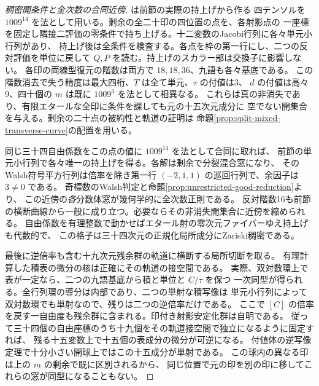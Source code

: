 \begin{proof}[稠密開条件と全次数の合同近傍]
 は前節の実際の持上げから作る
四テンソルを $1009^{14}$ を法として用いる。剰余の全二十印の四位置の点を、各射影点の
一座標を固定し隣接二評価の零条件で持ち上げる。十二変数のJacobi行列に各々単元小行列があり、
持上げ後は全条件を検査する。各点を枠の第一行にし、二つの反対評価を単位に戻して
$Q,P$ を読む。持上げのスカラー部は交換子に影響しない。
各印の両線型復元の階数は両方で $18,18,36$、九語も各々基底である。
この階数消去で失う精度は最大四桁、$T$ は全て単元、$\tau$ の付値は3、
$d$ の付値は高々9、四十個の $m$ は既に $1009^3$ を法として相異なる。
これらは真の非消失であり、有限エタールな全印に条件を課しても元の十五次元成分に
空でない開集合を与える。剰余の二十点の被約性と軌道の証明は
命題\ref{prop:split-mixed-transverse-curve}の配置を用いる。

同じ三十四自由係数をこの点の値に $1009^{14}$ を法として合同に取れば、
前節の単元小行列で各々唯一の持上げを得る。各解は剰余で分裂混合窓になり、
そのWalsh符号平方行列は倍率を除き第一行 $(-2,1,1)$ の巡回行列で、余因子は $3\ne0$ である。
奇標数のWalsh判定と命題\ref{prop:unrestricted-good-reduction}より、
この近傍の\emph{各}分数体窓が幾何学的に全次数正則である。
反対階数16も前節の横断曲線から一般に成り立つ。必要ならその非消失開集合に近傍を縮められる。
自由係数を有理整数で動かせばエタール射の零次元ファイバーゆえ持上げも代数的で、
この格子は三十四次元の正規化局所成分にZariski稠密である。

最後に逆倍率も含む十九次元残余群の軌道に横断する局所切断を取る。
有理計算した積表の微分の核は正確にその軌道の接空間である。
実際、双対数環上で表が一定なら、二つの九語基底から積と単位と $C/\tau$ を保つ
一次同型が得られる。全行列環の導分は内部であり、二つの単射な積写像は
単元小行列によって双対数環でも単射なので、残りは二つの逆倍率だけである。
ここで $[C]$ の倍率を戻す一自由度も残余群に含まれる。印付き射影安定化群は自明である。
従って三十四個の自由座標のうち十九個をその軌道接空間で独立になるように固定すれば、
残る十五変数上で十五個の表成分の微分が可逆になる。
付値体の逆写像定理で十分小さい開球上ではこの十五成分が単射である。
この球内の異なる印は上の $m$ の剰余で既に区別されるから、
同じ位置で元の印を別の印に移してこれらの窓が同型になることもない。
\end{proof}
